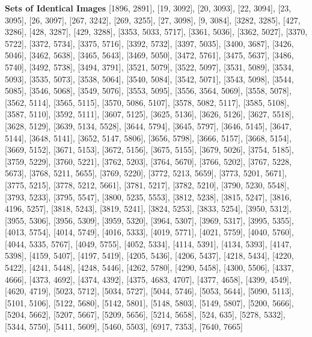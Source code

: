 \textbf{Sets of Identical Images}
[1896, 2891], [19, 3092], [20, 3093], [22, 3094], [23, 3095], [26, 3097], [267, 3242], [269, 3255], [27, 3098], [9, 3084], [3282, 3285], [427, 3286], [428, 3287], [429, 3288], [3353, 5033, 5717], [3361, 5036], [3362, 5027], [3370, 5722], [3372, 5734], [3375, 5716], [3392, 5732], [3397, 5035], [3400, 3687], [3426, 5046], [3462, 5638], [3465, 5643], [3469, 5050], [3472, 5761], [3475, 5637], [3486, 5740], [3492, 5738], [3494, 3791], [3521, 5079], [3522, 5097], [3531, 5089], [3534, 5093], [3535, 5073], [3538, 5064], [3540, 5084], [3542, 5071], [3543, 5098], [3544, 5085], [3546, 5068], [3549, 5076], [3553, 5095], [3556, 3564, 5069], [3558, 5078], [3562, 5114], [3565, 5115], [3570, 5086, 5107], [3578, 5082, 5117], [3585, 5108], [3587, 5110], [3592, 5111], [3607, 5125], [3625, 5136], [3626, 5126], [3627, 5518], [3628, 5129], [3639, 5134, 5528], [3644, 5794], [3645, 5797], [3646, 5145], [3647, 5144], [3648, 5141], [3652, 5147, 5806], [3656, 5798], [3666, 5157], [3668, 5154], [3669, 5152], [3671, 5153], [3672, 5156], [3675, 5155], [3679, 5026], [3754, 5185], [3759, 5229], [3760, 5221], [3762, 5203], [3764, 5670], [3766, 5202], [3767, 5228, 5673], [3768, 5211, 5655], [3769, 5220], [3772, 5213, 5659], [3773, 5201, 5671], [3775, 5215], [3778, 5212, 5661], [3781, 5217], [3782, 5210], [3790, 5230, 5548], [3793, 5233], [3795, 5547], [3800, 5235, 5553], [3812, 5238], [3815, 5247], [3816, 4196, 5257], [3818, 5243], [3819, 5241], [3824, 5253], [3833, 5254], [3950, 5312], [3955, 5306], [3956, 5309], [3959, 5320], [3964, 5307], [3969, 5317], [3995, 5355], [4013, 5754], [4014, 5749], [4016, 5333], [4019, 5771], [4021, 5759], [4040, 5760], [4044, 5335, 5767], [4049, 5755], [4052, 5334], [4114, 5391], [4134, 5393], [4147, 5398], [4159, 5407], [4197, 5419], [4205, 5436], [4206, 5437], [4218, 5434], [4220, 5422], [4241, 5448], [4248, 5446], [4262, 5780], [4290, 5458], [4300, 5506], [4337, 4666], [4373, 4692], [4374, 4392], [4375, 4683, 4707], [4377, 4658], [4399, 4549], [4620, 4719], [5023, 5712], [5034, 5727], [5044, 5746], [5053, 5644], [5090, 5113], [5101, 5106], [5122, 5680], [5142, 5801], [5148, 5803], [5149, 5807], [5200, 5666], [5204, 5662], [5207, 5667], [5209, 5656], [5214, 5658], [524, 635], [5278, 5332], [5344, 5750], [5411, 5609], [5460, 5503], [6917, 7353], [7640, 7665]


